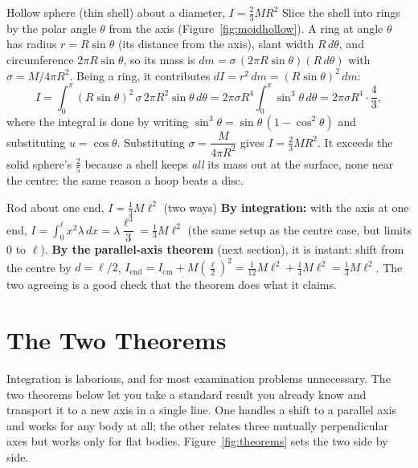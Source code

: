 \begin{derivbox}{Hollow sphere (thin shell) about a diameter, $I=\tfrac{2}{3} MR^2$}
Slice the shell into rings by the polar angle $\theta$ from the axis (Figure~\ref{fig:moidhollow}). A ring at angle $\theta$ has radius
$r=R\sin\theta$ (its distance from the axis), slant width $R\,d\theta$, and circumference
$2\pi R\sin\theta$, so its mass is $dm=\sigma\,(2\pi R\sin\theta)(R\,d\theta)$ with $\sigma=M/4\pi R^2$.
Being a ring, it contributes $dI=r^2\,dm=(R\sin\theta)^2\,dm$:
\[
I=\int_0^\pi (R\sin\theta)^2\,\sigma\,2\pi R^2\sin\theta\,d\theta
=2\pi\sigma R^4\int_0^\pi \sin^3\theta\,d\theta=2\pi\sigma R^4\cdot\frac{4}{3},
\]
where the integral is done by writing $\sin^3\theta=\sin\theta\,(1-\cos^2\theta)$ and substituting $u=\cos\theta$.
Substituting $\sigma=\dfrac{M}{4\pi R^2}$ gives $\boxed{I=\tfrac{2}{3} MR^2}$. It exceeds the solid sphere's
$\tfrac{2}{5}$ because a shell keeps \emph{all} its mass out at the surface, none near the centre: the same
reason a hoop beats a disc.
\end{derivbox}

\begin{figure}[htbp]
\centering
{}
\end{figure}

\begin{derivbox}{Rod about one end, $I=\tfrac{1}{3} M\ell^2$ (two ways)}
\textbf{By integration:} with the axis at one end, $I=\int_0^{\ell} x^2\lambda\,dx=\lambda\dfrac{\ell^3}{3}=\tfrac{1}{3} M\ell^2$
(the same setup as the centre case, but limits $0$ to $\ell$). \textbf{By the parallel-axis theorem} (next
section), it is instant: shift from the centre by $d=\ell/2$,
$I_{\text{end}}=I_{\text{cm}}+M\left(\tfrac{\ell}{2}\right)^2=\tfrac{1}{12}M\ell^2+\tfrac{1}{4} M\ell^2=\tfrac{1}{3} M\ell^2$.
The two agreeing is a good check that the theorem does what it claims.
\end{derivbox}

\section{The Two Theorems}
Integration is laborious, and for most examination problems unnecessary. The two theorems below let you take a standard result you
already know and transport it to a new axis in a single line. One handles a shift to a parallel axis and
works for any body at all; the other relates three mutually perpendicular axes but works only for flat
bodies. Figure~\ref{fig:theorems} sets the two side by side.


